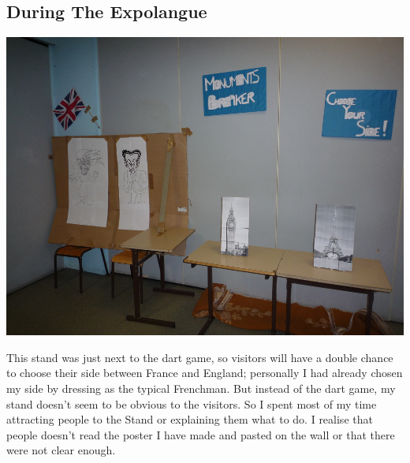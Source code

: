 \documentclass[11pt;a4paper]{report}
\begin{document}
\subsection{During The Expolangue}

\begin{center}
\includegraphics[width=15cm]{images/MB}
\end{center}

    This stand was just next to the dart game, so visitors will have a double chance to choose their side between France and England; personally I had already chosen my side by dressing as the typical Frenchman. But instead of the dart game, my stand doesn’t seem to be obvious to the visitors. So I spent most of my time attracting people to the Stand or explaining them what to do. I realise that people doesn’t read the poster I have made and pasted on the wall or that there were not clear enough.
\end{document}
